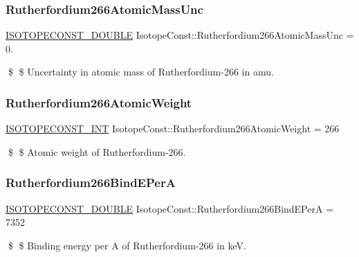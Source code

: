 \subsubsection{\texorpdfstring{Rutherfordium266\+Atomic\+Mass\+Unc}{Rutherfordium266AtomicMassUnc}}
{\footnotesize\ttfamily \mbox{\hyperlink{group___isotope_const-_macros_ga8f45a7272ce02c0b4c65c44636ed719a}{I\+S\+O\+T\+O\+P\+E\+C\+O\+N\+S\+T\+\_\+\+D\+O\+U\+B\+LE}} Isotope\+Const\+::\+Rutherfordium266\+Atomic\+Mass\+Unc = 0.}

\$ \$ Uncertainty in atomic mass of Rutherfordium-\/266 in amu. \mbox{\label{group___isotope_const-_rutherfordium-_rf266_ga88869dddd667bee67431a885866bb545}} 
\subsubsection{\texorpdfstring{Rutherfordium266\+Atomic\+Weight}{Rutherfordium266AtomicWeight}}
{\footnotesize\ttfamily \mbox{\hyperlink{group___isotope_const-_macros_ga5f18360b3e99483a35c32d789e62621c}{I\+S\+O\+T\+O\+P\+E\+C\+O\+N\+S\+T\+\_\+\+I\+NT}} Isotope\+Const\+::\+Rutherfordium266\+Atomic\+Weight = 266}

\$ \$ Atomic weight of Rutherfordium-\/266. \mbox{\label{group___isotope_const-_rutherfordium-_rf266_gaea4bb6880f911497d4ad07bb4f2acac6}} 
\subsubsection{\texorpdfstring{Rutherfordium266\+Bind\+E\+PerA}{Rutherfordium266BindEPerA}}
{\footnotesize\ttfamily \mbox{\hyperlink{group___isotope_const-_macros_ga8f45a7272ce02c0b4c65c44636ed719a}{I\+S\+O\+T\+O\+P\+E\+C\+O\+N\+S\+T\+\_\+\+D\+O\+U\+B\+LE}} Isotope\+Const\+::\+Rutherfordium266\+Bind\+E\+PerA = 7352}

\$ \$ Binding energy per A of Rutherfordium-\/266 in keV. \mbox{\label{group___isotope_const-_rutherfordium-_rf266_gaebcac93f5f4a4f3d0ea6a9703b766ebf}} 
